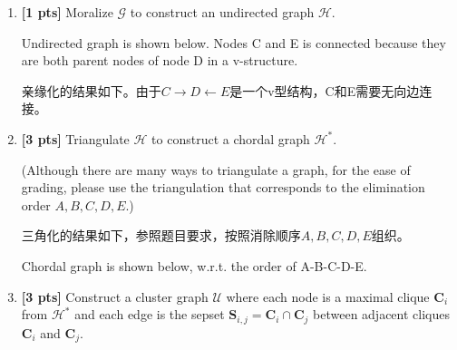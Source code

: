 \documentclass[12pt]{article}
\newcommand{\Gcal}{\mathcal{G}}
\newcommand{\Hcal}{\mathcal{H}}
\newcommand{\Ucal}{\mathcal{U}}
\newcommand{\Cbs}{\boldsymbol{C}}
\newcommand{\Sbs}{\boldsymbol{S}}
\begin{document}
\begin{enumerate}
	\item \textbf{[1 pts]} Moralize $ \Gcal $ to construct an undirected graph $ \Hcal $.
	      \begin{solution}
		      Undirected graph is shown below. Nodes C and E is connected because they are both
		      parent nodes of node D in a v-structure.

		      亲缘化的结果如下。由于$C \rightarrow D \leftarrow E$是一个v型结构，C和E需要无向边连接。
	      \end{solution}

	      \begin{figure}[h]
		      \centering
	      \end{figure}

	\item \textbf{[3 pts]} Triangulate $ \Hcal $ to construct a chordal graph $ \Hcal^* $.

	      (Although there are many ways to triangulate a graph, for the ease of grading, please use the triangulation that corresponds to the elimination order $ A, B, C, D, E $.)

	      \begin{solution}
		      三角化的结果如下，参照题目要求，按照消除顺序$A,B,C,D,E$组织。

		      Chordal graph is shown below, w.r.t. the order of A-B-C-D-E.
	      \end{solution}

	      \begin{figure}[h]
		      \centering
	      \end{figure}



	\item \textbf{[3 pts]} Construct a cluster graph $ \Ucal $ where each node is a maximal clique $ \Cbs_i $ from $ \Hcal^* $ and each edge is the sepset $ \Sbs_{i,j} = \Cbs_i \cap \Cbs_j $ between adjacent cliques $ \Cbs_i $ and $ \Cbs_j $.


\end{enumerate}
\end{document}
